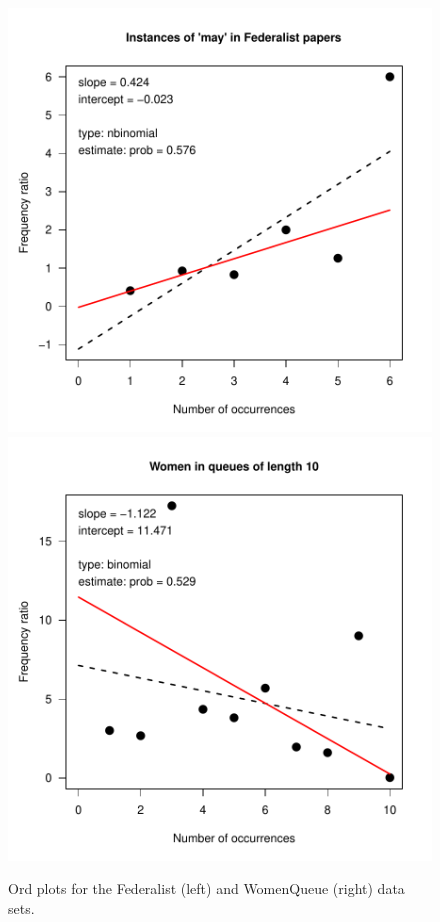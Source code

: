 \documentclass[11pt]{book}
\renewenvironment{knitrout}{\small\renewcommand{\baselinestretch}{.85}}{} %
\begin{document}
\begin{knitrout}
\color{fgcolor}\begin{kframe}
\begin{alltt}
  \hlstd{=} \hlstd{,}
         \hlstd{=}\hlstd{(}\hlstd{=}\hlstd{),} \hlstd{=}\hlstd{)}
  \hlstd{=} \hlstd{,}
         \hlstd{=}\hlstd{(}\hlstd{=}\hlstd{),} \hlstd{=}\hlstd{)}
\end{alltt}
\end{kframe}\begin{figure}[!htbp]


\centerline{\includegraphics[width=.48\textwidth]{ch03/fig/ordplot31} 
\includegraphics[width=.48\textwidth]{ch03/fig/ordplot32} }

\caption[Ord plots for the Federalist (left) and WomenQueue (right) data sets]{Ord plots for the Federalist (left) and WomenQueue (right) data sets.\label{fig:ordplot3}}
\end{figure}


\end{knitrout}
\end{document}
